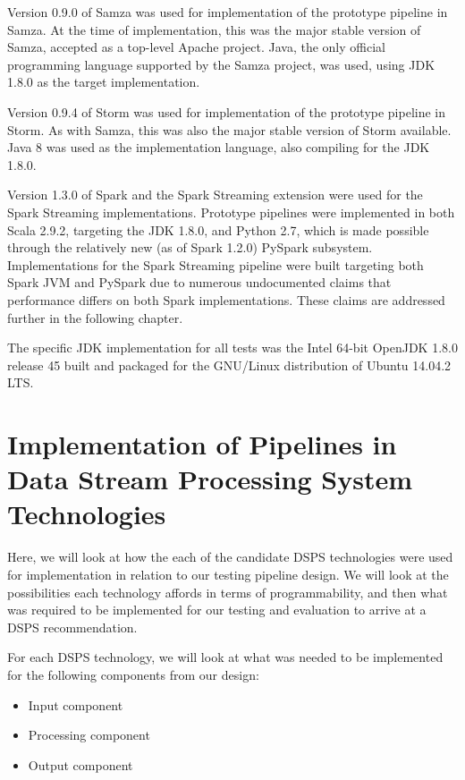 Version 0.9.0 of Samza was used for implementation of the prototype pipeline in Samza. At the time of implementation,
this was the major stable version of Samza, accepted as a top-level Apache project. Java, the only official programming
language supported by the Samza project, was used, using JDK 1.8.0 as the target implementation.

Version 0.9.4 of Storm was used for implementation of the prototype pipeline in Storm. As with Samza, this was also the
major stable version of Storm available. Java 8 was used as the implementation language, also compiling for the JDK 1.8.0.

Version 1.3.0 of Spark and the Spark Streaming extension were used for the Spark Streaming implementations. Prototype pipelines were
implemented in both Scala 2.9.2, targeting the JDK 1.8.0, and Python 2.7, which is made possible through the relatively new (as of Spark 1.2.0)
PySpark subsystem. Implementations for the Spark Streaming pipeline were built targeting both Spark JVM and PySpark due
to numerous undocumented claims that performance differs on both Spark implementations. These claims are addressed further
in the following chapter.

The specific JDK implementation for all tests was the Intel 64-bit OpenJDK 1.8.0 release 45 built and packaged for the GNU/Linux
distribution of Ubuntu 14.04.2 LTS.




\section{Implementation of Pipelines in Data Stream Processing System Technologies} %
\label{sub:implementation_of_pipelines_in_dsps_technol}

Here, we will look at how the each of the candidate DSPS technologies were used for implementation in relation to our testing
pipeline design. We will look at the possibilities each technology affords in terms of programmability, and then what was
required to be implemented for our testing and evaluation to arrive at a DSPS recommendation.

For each DSPS technology, we will look at what was needed to be implemented for the following components from our design:

\begin{itemize}
  \item Input component
  \item Processing component
  \item Output component
\end{itemize}

